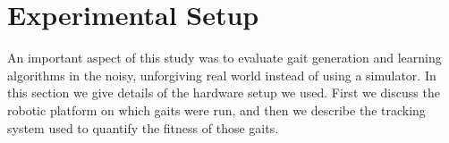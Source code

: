 \section{Experimental Setup}

An important aspect of this study was to evaluate gait generation and
learning algorithms in the noisy, unforgiving real world instead of
using a simulator.  In this section we give details of the hardware
setup we used.  First we discuss the robotic platform on which gaits
were run, and then we describe the tracking system used to quantify
the fitness of those gaits.



%

%
